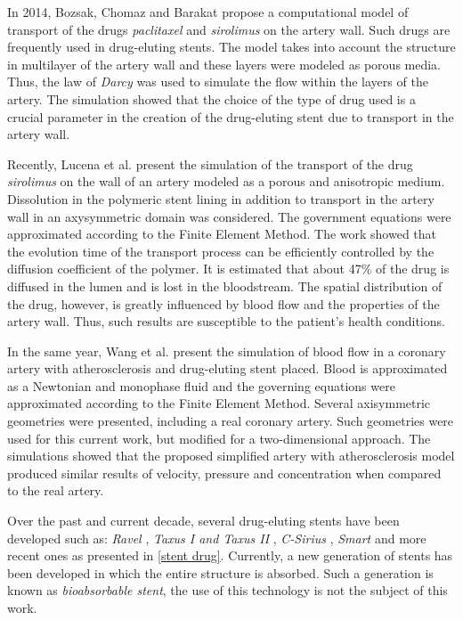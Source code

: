 \medskip
In 2014, Bozsak, Chomaz and Barakat \cite{bozsak2014} propose a computational model of transport
of the drugs \textit{paclitaxel} and \textit{sirolimus} on the artery wall. Such drugs are
frequently used in drug-eluting stents. The model takes into account the structure in
multilayer of the artery wall and these layers were modeled as porous media.
Thus, the law of \textit{Darcy} was used to simulate the flow within the layers
of the artery. The simulation showed that the choice of the type of drug used
is a crucial parameter in the creation of the drug-eluting stent
due to transport in the artery wall.

\medskip
Recently, Lucena et al. \cite{lucena2017} present 
the simulation of the transport of the drug \textit{sirolimus}
 on the wall of an artery modeled as a porous and anisotropic medium.
 Dissolution in the polymeric stent lining in addition to transport
 in the artery wall in an axysymmetric domain was considered.
 The government equations were approximated according to
 the Finite Element Method. The work showed that the evolution time
 of the transport process can be efficiently controlled by
 the diffusion coefficient of the polymer. It is estimated that
 about 47\% of the drug is diffused in the lumen and is lost in
 the bloodstream. The spatial distribution of the drug, however,
 is greatly influenced by blood flow and the properties of 
the artery wall. Thus, such results are susceptible to the
 patient's health conditions.

\medskip
In the same year, Wang et al. \cite{wang2017} present the simulation
 of blood flow in a coronary artery with atherosclerosis and
 drug-eluting stent placed. Blood is approximated as a Newtonian and
 monophase fluid and the governing equations were approximated
 according to the Finite Element Method. Several axisymmetric
 geometries were presented, including a real coronary artery.
 Such geometries were used for this current work, but modified
 for a two-dimensional approach. The simulations showed that
 the proposed simplified artery with atherosclerosis model
 produced similar results of velocity, pressure and concentration
 when compared to the real artery.


\medskip
Over the past and current decade, several drug-eluting stents
 have been developed such as: \textit{Ravel} \cite{morice2002},
 \textit{Taxus I and Taxus II} \cite{grube2003} \cite{colombo2003},
 \textit{C-Sirius} \cite{schampaert2004},
 \textit{Smart} \cite{ardissino2004} and
 more recent ones as presented in \ref{stent drug}. 
Currently, a new generation of stents has been developed
 in which the entire structure is absorbed. 
Such a generation is known as \textit{bioabsorbable stent}, 
the use of this technology is not the subject of this work.


